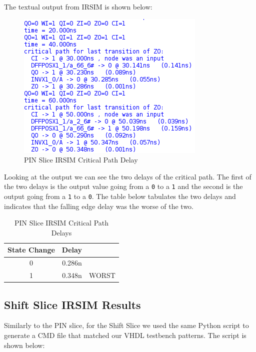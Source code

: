         The textual output from IRSIM is shown below:

        \begin{figure}[H]
            \centering
            \includegraphics[width=0.5\linewidth]{../../irsim/pin_slice_timing.png}
            \caption{PIN Slice IRSIM Critical Path Delay}
        \end{figure}
        \vspace{\baselineskip}

        Looking at the output we can see the two delays of the critical path.
        The first of the two delays is the output value going from a \texttt{0} to
        a \texttt{1} and the second is the output going from a \texttt{1} to a
        \texttt{0}.  The table below tabulates the two delays and indicates
        that the falling edge delay was the worse of the two.
        \vspace{\baselineskip}

        \begin{table}[H]
            \centering
            \begin{tabular}{crc}
                \toprule
                \textbf{State Change} & \textbf{Delay} & \\
                \midrule
                0 & 0.286n & \\
                1 & 0.348n & WORST \\
                \bottomrule
            \end{tabular}
            \caption{PIN Slice IRSIM Critical Path Delays}
        \end{table}

    \newpage
    \subsection{Shift Slice IRSIM Results}

        Similarly to the PIN slice, for the Shift Slice we used the same Python
        script to generate a CMD file that matched our VHDL testbench patterns.
        The script is shown below:

